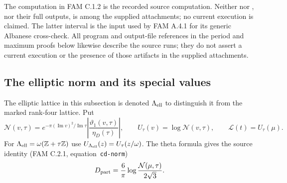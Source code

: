 \documentclass[11pt,a4paper]{article}
\theoremstyle{plain}
\theoremstyle{definition}
\begin{document}
The computation in FAM C.1.2 is the recorded source computation. Neither  nor , nor their full outputs, is among the supplied attachments; no current execution is claimed. The latter interval is the input used by FAM A.4.1 for its generic Albanese cross-check. All program and output-file references in the period and maximum proofs below likewise describe the source runs; they do not assert a current execution or the presence of those artifacts in the supplied attachments.

\subsection{The elliptic norm and its special values}
The elliptic lattice in this subsection is denoted $\Lambda_{\rm ell}$ to distinguish it from the marked rank-four lattice. Put
\[
\mathcal N(v,\tau)=e^{-\pi(\operatorname{Im}v)^2/\operatorname{Im}\tau}
\left|\frac{\vartheta_1(v,\tau)}{\eta_D(\tau)}\right|,
\qquad U_\tau(v)=\log\mathcal N(v,\tau),
\qquad \mathcal L(t)=U_\tau(\mu).
\]
For $\Lambda_{\rm ell}=\omega(\mathbb Z+\tau\mathbb Z)$ use $U_{\Lambda_{\rm ell}}(z)=U_\tau(z/\omega)$.
The theta formula gives the source identity (FAM C.2.1, equation~\texttt{cd-norm})
\begin{equation}\label{fam:eq:cd-norm}
D_{\rm part}=\frac6\pi\log\frac{\mathcal N(\mu,\tau)}{2\sqrt3}.
\end{equation}
\end{document}
